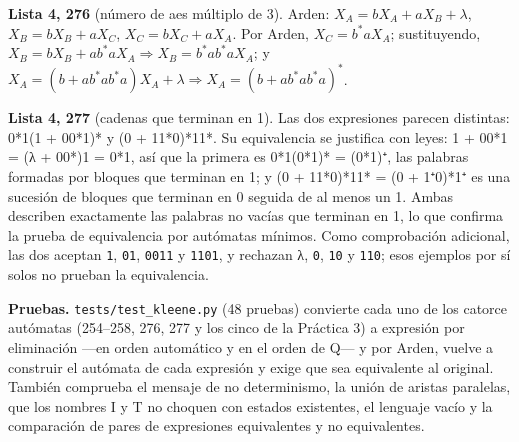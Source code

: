 \textbf{Lista 4, 276} (número de aes múltiplo de 3). Arden: \(X_A = bX_A + aX_B + \lambda\), \(X_B = bX_B + aX_C\), \(X_C = bX_C + aX_A\). Por Arden, \(X_C = b^*aX_A\); sustituyendo, \(X_B = bX_B + ab^*aX_A \Rightarrow X_B = b^*ab^*aX_A\); y \(X_A = (b + ab^*ab^*a)X_A + \lambda \Rightarrow X_A = (b + ab^*ab^*a)^*\).

\textbf{Lista 4, 277} (cadenas que terminan en 1). Las dos expresiones parecen distintas: 0*1(1 + 00*1)* y (0 + 11*0)*11*. Su equivalencia se justifica con leyes: 1 + 00*1 = (λ + 00*)1 = 0*1, así que la primera es 0*1(0*1)* = (0*1)⁺, las palabras formadas por bloques que terminan en 1; y (0 + 11*0)*11* = (0 + 1⁺0)*1⁺ es una sucesión de bloques que terminan en 0 seguida de al menos un 1. Ambas describen exactamente las palabras no vacías que terminan en 1, lo que confirma la prueba de equivalencia por autómatas mínimos. Como comprobación adicional, las dos aceptan \texttt{1}, \texttt{01}, \texttt{0011} y \texttt{1101}, y rechazan λ, \texttt{0}, \texttt{10} y \texttt{110}; esos ejemplos por sí solos no prueban la equivalencia.

\textbf{Pruebas.} \texttt{tests/test\_kleene.py} (48 pruebas) convierte cada uno de los catorce autómatas (254--258, 276, 277 y los cinco de la Práctica 3) a expresión por eliminación ---en orden automático y en el orden de Q--- y por Arden, vuelve a construir el autómata de cada expresión y exige que sea equivalente al original. También comprueba el mensaje de no determinismo, la unión de aristas paralelas, que los nombres I y T no choquen con estados existentes, el lenguaje vacío y la comparación de pares de expresiones equivalentes y no equivalentes.
